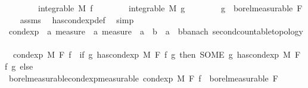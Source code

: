 \begin{isabellebody}
\ \ \ \ \ \ \ \ {\isachardoublequoteopen}integrable\ M\ f{\isachardoublequoteclose}\isanewline
\ \ \ \ \ \ \ \ {\isachardoublequoteopen}integrable\ M\ g{\isachardoublequoteclose}\isanewline
\ \ \ \ \ \ \ \ {\isachardoublequoteopen}g\ {\isasymin}\ borel{\isacharunderscore}{\kern0pt}measurable\ F{\isachardoublequoteclose}\isanewline
%
\isadelimproof
\ \ %
\endisadelimproof
%
\isatagproof
{}\isamarkupfalse%
\ assms\ \isamarkupfalse%
\ has{\isacharunderscore}{\kern0pt}cond{\isacharunderscore}{\kern0pt}exp{\isacharunderscore}{\kern0pt}def\ \isamarkupfalse%
\ simp{\isacharplus}{\kern0pt}%
\endisatagproof
{\isafoldproof}%
%
\isadelimproof
\isanewline
%
\endisadelimproof
\isanewline
\isanewline
\isanewline
{}\isamarkupfalse%
\ cond{\isacharunderscore}{\kern0pt}exp\ {\isacharcolon}{\kern0pt}{\isacharcolon}{\kern0pt}\ {\isachardoublequoteopen}{\isacharprime}{\kern0pt}a\ measure\ {\isasymRightarrow}\ {\isacharprime}{\kern0pt}a\ measure\ {\isasymRightarrow}\ {\isacharparenleft}{\kern0pt}{\isacharprime}{\kern0pt}a\ {\isasymRightarrow}\ {\isacharprime}{\kern0pt}b{\isacharparenright}{\kern0pt}\ {\isasymRightarrow}\ {\isacharparenleft}{\kern0pt}{\isacharprime}{\kern0pt}a\ {\isasymRightarrow}\ {\isacharprime}{\kern0pt}b{\isacharcolon}{\kern0pt}{\isacharcolon}{\kern0pt}{\isacharbraceleft}{\kern0pt}banach{\isacharcomma}{\kern0pt}\ second{\isacharunderscore}{\kern0pt}countable{\isacharunderscore}{\kern0pt}topology{\isacharbraceright}{\kern0pt}{\isacharparenright}{\kern0pt}{\isachardoublequoteclose}\ \isanewline
\ \ {\isachardoublequoteopen}cond{\isacharunderscore}{\kern0pt}exp\ M\ F\ f\ {\isacharequal}{\kern0pt}\ {\isacharparenleft}{\kern0pt}if\ {\isasymexists}g{\isachardot}{\kern0pt}\ has{\isacharunderscore}{\kern0pt}cond{\isacharunderscore}{\kern0pt}exp\ M\ F\ f\ g\ then\ {\isacharparenleft}{\kern0pt}SOME\ g{\isachardot}{\kern0pt}\ has{\isacharunderscore}{\kern0pt}cond{\isacharunderscore}{\kern0pt}exp\ M\ F\ f\ g{\isacharparenright}{\kern0pt}\ else\ {\isacharparenleft}{\kern0pt}{\isasymlambda}{\isacharunderscore}{\kern0pt}{\isachardot}{\kern0pt}\ {}{\isacharparenright}{\kern0pt}{\isacharparenright}{\kern0pt}{\isachardoublequoteclose}\isanewline
\isanewline
{}\isamarkupfalse%
\ borel{\isacharunderscore}{\kern0pt}measurable{\isacharunderscore}{\kern0pt}cond{\isacharunderscore}{\kern0pt}exp{\isacharbrackleft}{\kern0pt}measurable{\isacharbrackright}{\kern0pt}{\isacharcolon}{\kern0pt}\ {\isachardoublequoteopen}cond{\isacharunderscore}{\kern0pt}exp\ M\ F\ f\ {\isasymin}\ borel{\isacharunderscore}{\kern0pt}measurable\ F{\isachardoublequoteclose}\ \isanewline

\end{isabellebody}
